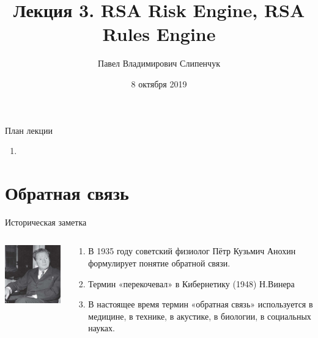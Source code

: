 


\title{Лекция 3. RSA Risk Engine, RSA Rules Engine}
\date{8 октября 2019}
\author{Павел Владимирович Слипенчук}


  \maketitle
    
\begin{frame}{План лекции}
    \begin{enumerate}
		\item {}
	\end{enumerate}
\end{frame}

\section{Обратная связь}\label{section:feedback}

\begin{frame}{Историческая заметка}
	\begin{columns}
		\begin{column}{0.5\textwidth}
			\includegraphics[width=5cm]{../pic/anohin.jpg}
		\end{column}
		\begin{column}{0.6\textwidth}
			\begin{enumerate}
				\item В 1935 году советский физиолог
				Пётр Кузьмич Анохин формулирует понятие обратной связи.
				\item Термин «перекочевал» в Кибернетику (1948) Н.Винера
				\item В настоящее время термин «обратная связь» используется в медицине, в технике, в акустике, в биологии, в социальных науках.
			\end{enumerate}
		\end{column}
	\end{columns}
\end{frame}

